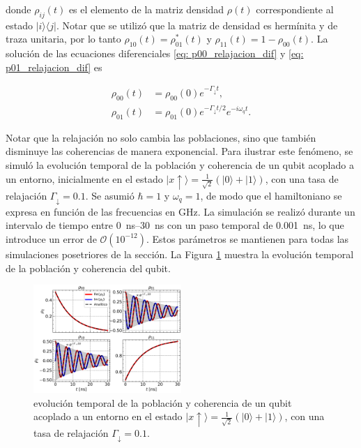\noindent donde \(\rho_{ij}(t)\) es el elemento de la matriz densidad \(\rho(t)\) correspondiente al estado \(|i\rangle\langle j|\). Notar que se utilizó que la matriz de densidad es hermínita y de traza unitaria, por lo tanto \(\rho_{10}(t) = \rho_{01}^*(t)\) y \(\rho_{11}(t) = 1 - \rho_{00}(t)\). La solución de las ecuaciones diferenciales \ref{eq: p00_relajacion_dif} y \ref{eq: p01_relajacion_dif} es

\begin{align}
    \rho_{00}(t) &= \rho_{00}(0) e^{-\Gamma_\downarrow t} \label{eq: p00_relajacion_sol}, \\
    \rho_{01}(t) &= \rho_{01}(0)e^{- \Gamma_\downarrow t / 2} e^{-i \omega_q t}   \label{eq: p01_relajacion_sol}.
\end{align}

Notar que la relajación no solo cambia las poblaciones, sino que también disminuye las coherencias de manera exponencial. Para ilustrar este fenómeno, se simuló la evolución temporal de la población y coherencia de un qubit acoplado a un entorno, inicialmente en el estado \(|x\uparrow\rangle = \frac{1}{\sqrt{2}}(|0\rangle + |1\rangle)\), con una tasa de relajación \(\Gamma_\downarrow = 0.1\). Se asumió \(\hbar = 1\) y \(\omega_q = 1\), de modo que el hamiltoniano se expresa en función de las frecuencias en \si{\giga\hertz}. La simulación se realizó durante un intervalo de tiempo entre \SIrange{0}{30}{\nano\second} con un paso temporal de \SI{0.001}{\nano\second}, lo que introduce un error de \(\mathcal{O}(10^{-12})\). Estos parámetros se mantienen para todas las simulaciones posetriores de la sección. La Figura \ref{fig: x_plus_relaxation} muestra la evolución temporal de la población y coherencia del qubit.

\begin{figure} [htbp]
    \centering
    \includegraphics[width=0.5\textwidth]{figures/x_plus_relaxation.pdf}
    \caption{evolución temporal de la población y coherencia de un qubit acoplado a un entorno en el estado \(|x\uparrow\rangle = \frac{1}{\sqrt{2}}(|0\rangle + |1\rangle)\), con una tasa de relajación \(\Gamma_\downarrow = 0.1\).}
    \label{fig: x_plus_relaxation}
\end{figure}

